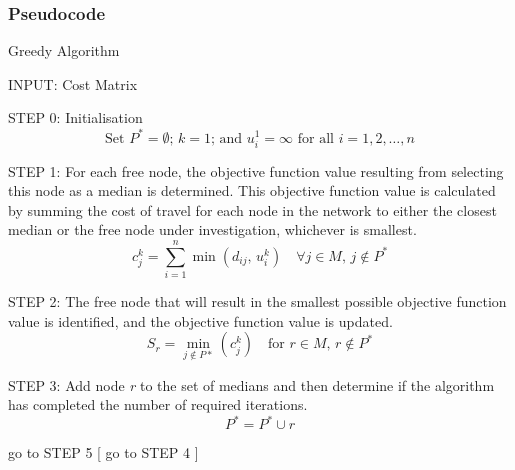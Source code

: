 \documentclass[11pt]{article}
\begin{document}
	\subsubsection{Pseudocode}
	\begin{algorithm}
		\caption{Greedy Algorithm}
		\begin{algorithmic}[0]
			
			\Statex 
			\Statex INPUT: Cost Matrix
						
			\Statex
			\Statex STEP 0: Initialisation	
			\begin{equation*}
			\text{Set } P^{*} = \emptyset \text{; } k = 1\text{; and }u_i^1 = \infty\text{ for all } i=1,2,\dots,n
			\end{equation*}
			
			\Statex 
			\Statex STEP 1: For each free node, the objective function value resulting from selecting this node as a median is determined.  This objective function value is calculated by summing the cost of travel for each node in the network to either the closest median or the free node under investigation, whichever is smallest.
			\begin{equation*}
			c_j^k = \sum_{i=1}^{n}\min(d_{ij} \text{, } u_i^k) \quad \forall j \in M \text{, } j \notin P^*
			\end{equation*}
			
			\Statex 
			\Statex STEP 2: The free node that will result in the smallest possible objective function value is identified, and the objective function value is updated.
			\begin{equation*}
			S_r = \min_{j \notin P*}(c_j^k) \quad \text{for } r \in M \text{, } r \notin P^*
			\end{equation*}
			
			\Statex 
			\Statex STEP 3: Add node \emph{r} to the set of medians and then determine if the algorithm has completed the number of required iterations.
			\begin{equation*}
			P^* = P^* \cup r
			\end{equation*}
			
			\Statex go to STEP 5
			[
			\Else
			\Statex go to STEP 4
			]
			\EndIf
			
\Statex	

\end{algorithmic}
\end{algorithm}
\end{document}
